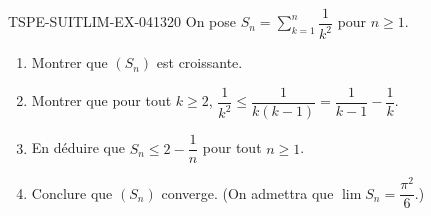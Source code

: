 \begin{exercice}{TSPE-SUITLIM-EX-041}{3}{20}
On pose $S_n = \displaystyle\sum_{k=1}^{n} \dfrac{1}{k^2}$ pour $n \geq 1$.
\begin{enumerate}
  \item Montrer que $(S_n)$ est croissante.
  \item Montrer que pour tout $k \geq 2$, $\dfrac{1}{k^2} \leq \dfrac{1}{k(k-1)} = \dfrac{1}{k-1} - \dfrac{1}{k}$.
  \item En déduire que $S_n \leq 2 - \dfrac{1}{n}$ pour tout $n \geq 1$.
  \item Conclure que $(S_n)$ converge. (On admettra que $\lim S_n = \dfrac{\pi^2}{6}$.)
\end{enumerate}
\end{exercice}
